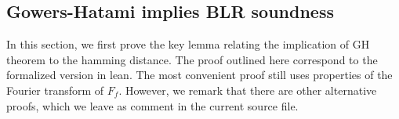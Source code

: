 
\subsection{Gowers-Hatami implies BLR soundness}
In this section, we first prove the key lemma relating the implication of GH theorem to the hamming distance. 
The proof outlined here correspond to the formalized version in lean. The most convenient proof still uses properties of the Fourier transform of $F_f$. However, we remark that there are other alternative proofs, which we leave as comment in the current source file.





